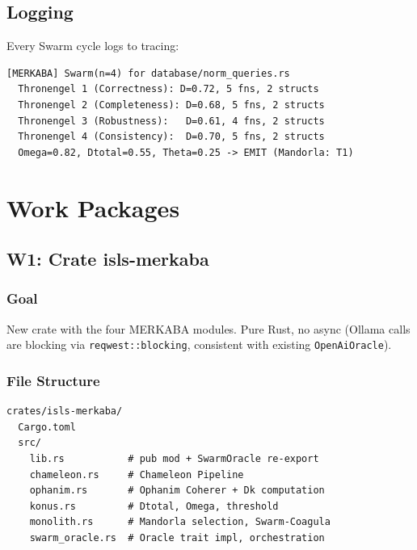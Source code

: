 \documentclass[11pt,a4paper]{article}
\begin{document}
\subsection{Logging}

Every Swarm cycle logs to tracing:

\begin{lstlisting}[style=bash]
[MERKABA] Swarm(n=4) for database/norm_queries.rs
  Thronengel 1 (Correctness): D=0.72, 5 fns, 2 structs
  Thronengel 2 (Completeness): D=0.68, 5 fns, 2 structs
  Thronengel 3 (Robustness):   D=0.61, 4 fns, 2 structs
  Thronengel 4 (Consistency):  D=0.70, 5 fns, 2 structs
  Omega=0.82, Dtotal=0.55, Theta=0.25 -> EMIT (Mandorla: T1)
\end{lstlisting}


\section{Work Packages}

\subsection{W1: Crate isls-merkaba}
\label{sec:w1}

\subsubsection{Goal}

New crate with the four MERKABA modules. Pure Rust, no async 
(Ollama calls are blocking via \texttt{reqwest::blocking}, 
consistent with existing \texttt{OpenAiOracle}).

\subsubsection{File Structure}

\begin{lstlisting}[style=bash]
crates/isls-merkaba/
  Cargo.toml
  src/
    lib.rs           # pub mod + SwarmOracle re-export
    chameleon.rs     # Chameleon Pipeline
    ophanim.rs       # Ophanim Coherer + Dk computation
    konus.rs         # Dtotal, Omega, threshold
    monolith.rs      # Mandorla selection, Swarm-Coagula
    swarm_oracle.rs  # Oracle trait impl, orchestration
\end{lstlisting}
\end{document}
